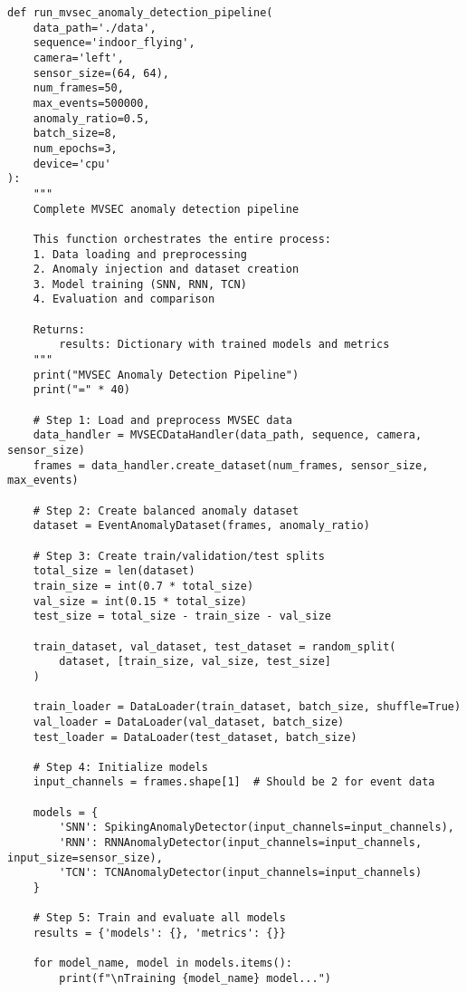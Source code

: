 \documentclass[12pt,a4paper]{article}
\begin{document}
\begin{lstlisting}[caption={Complete Pipeline Implementation - System Orchestrator Function}]
def run_mvsec_anomaly_detection_pipeline(
    data_path='./data',
    sequence='indoor_flying',
    camera='left',
    sensor_size=(64, 64),
    num_frames=50,
    max_events=500000,
    anomaly_ratio=0.5,
    batch_size=8,
    num_epochs=3,
    device='cpu'
):
    """
    Complete MVSEC anomaly detection pipeline

    This function orchestrates the entire process:
    1. Data loading and preprocessing
    2. Anomaly injection and dataset creation
    3. Model training (SNN, RNN, TCN)
    4. Evaluation and comparison

    Returns:
        results: Dictionary with trained models and metrics
    """
    print("MVSEC Anomaly Detection Pipeline")
    print("=" * 40)

    # Step 1: Load and preprocess MVSEC data
    data_handler = MVSECDataHandler(data_path, sequence, camera, sensor_size)
    frames = data_handler.create_dataset(num_frames, sensor_size, max_events)

    # Step 2: Create balanced anomaly dataset
    dataset = EventAnomalyDataset(frames, anomaly_ratio)

    # Step 3: Create train/validation/test splits
    total_size = len(dataset)
    train_size = int(0.7 * total_size)
    val_size = int(0.15 * total_size)
    test_size = total_size - train_size - val_size

    train_dataset, val_dataset, test_dataset = random_split(
        dataset, [train_size, val_size, test_size]
    )

    train_loader = DataLoader(train_dataset, batch_size, shuffle=True)
    val_loader = DataLoader(val_dataset, batch_size)
    test_loader = DataLoader(test_dataset, batch_size)

    # Step 4: Initialize models
    input_channels = frames.shape[1]  # Should be 2 for event data

    models = {
        'SNN': SpikingAnomalyDetector(input_channels=input_channels),
        'RNN': RNNAnomalyDetector(input_channels=input_channels, input_size=sensor_size),
        'TCN': TCNAnomalyDetector(input_channels=input_channels)
    }

    # Step 5: Train and evaluate all models
    results = {'models': {}, 'metrics': {}}

    for model_name, model in models.items():
        print(f"\nTraining {model_name} model...")


\end{lstlisting}
\end{document}
